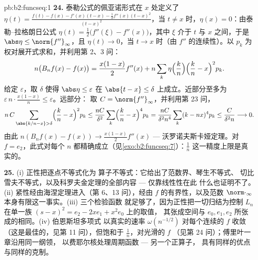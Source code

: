 \begin{solution}{pb:b2:funcseq:1}
\textbf{24.} 泰勒公式的佩亚诺形式在 $x$ 处定义了 $\eta(t) =
\frac{f(t) - f(x) - f'(x)(t-x) - \frac12f''(x)(t-x)^2}
{(t-x)^2}$，当 $t \neq x$ 时，$\eta(x) = 0$：由泰勒--拉格朗日公式
$\eta(t) = \frac12\bigl(f''(\xi) - f''(x)\bigr)$，其中 $\xi$
介于 $t$ 与 $x$ 之间，于是 $\abs\eta \leq \norm{f''}_\infty$，且
$\eta(t) \to 0$，当 $t \to x$ 时（由 $f''$ 的连续性）。以
$p_k$ 为权对展开式求和，并利用第 2、3 问：
\[
n\bigl(B_nf(x) - f(x)\bigr)
= \frac{x(1-x)}{2}f''(x)
+ n\sum_k\eta\Bigl(\frac kn\Bigr)\Bigl(\frac kn -
x\Bigr)^2p_k .
\]
给定 $\varepsilon$，取 $\delta$ 使得 $\abs\eta \leq
\varepsilon$ 在 $\abs{t - x}\leq\delta$ 上成立。近部分至多为
$\varepsilon\,n\cdot\frac{x(1-x)}n \leq \varepsilon$。远部分：
取 $C = \norm{f''}_\infty$，并利用第 23 问，
\[
n\,C\sum_{\abs{k/n-x}>\delta}\Bigl(\frac kn -
x\Bigr)^2p_k
\leq \frac{nC}{\delta^2}\sum_k\Bigl(\frac kn -
x\Bigr)^4p_k
= \frac{nC}{\delta^2 n^4}\sum_k(k-nx)^4p_k
\leq \frac{C}{\delta^2 n} \longrightarrow 0 .
\]
由此 $n(B_nf(x) - f(x)) \to \frac{x(1-x)}2f''(x)$ ---
沃罗诺夫斯卡娅定理。对 $f = e_2$，此式对每个
$n$ 都精确成立（见\cref{exo:b2:funcseq:7}）：$\frac1n$ 这一精度上限是真实的。

\textbf{25.} (i) 正性把逐点不等式化为
算子不等式：它给出了范数界、琴生不等式、
切比雪夫不等式，以及科罗夫金定理的全部内容 --- 仅靠线性性在此
什么也证明不了。(ii) 紧性经由海涅定理进入（第
6、13 问），经由 $f$ 的有界性，以及范数
$\norm\cdot_\infty$ 本身有限这一事实。(iii) 三个检验函数
就足够了，因为正性把一切归结为控制
$L_n$ 在单一族 $(s-x)^2 = e_2 - 2xe_1 + x^2e_0$ 上的取值，
其张成空间与 $e_0, e_1, e_2$ 所张成的相同。(iv) 伯恩斯坦多项式
以真实的速率 $\omega(n^{-1/2})$ 对每个连续的 $f$ 收敛
（这是最佳的，见第 11 问），但饱和于 $\frac1n$，对光滑的 $f$
（见第 24 问）；傅里叶一章沿用同一纲领，
以费耶尔核处理周期函数 --- 另一个正算子，
具有同样的优点与同样的克制。
\end{solution}
